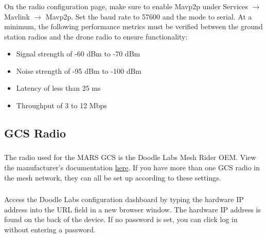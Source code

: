             \subsubsection{} On the radio configuration page, make sure to enable Mavp2p under Services $\rightarrow$ Mavlink $\rightarrow$ Mavp2p. Set the baud rate to 57600 and the mode to serial. At a minimum, the following performance metrics must be verified between the ground station radios and the drone radio to ensure functionality:
            \begin{itemize}
                \item Signal strength of  -60 dBm to -70 dBm
                \item Noise strength of -95 dBm to -100 dBm
                \item Latency of less than 25 ms
                \item Throughput of 3 to 12 Mbps
            \end{itemize} 
        
        \subsection{GCS Radio}
        
            \subsubsection{} The radio used for the MARS GCS is the Doodle Labs Mesh Rider OEM. View the manufacturer's documentation \textcolor{blue} {\href{https://techlibrary.doodlelabs.com/multiband-oem-mesh-rider-radio-915-mhz-and-2450-mhz-ism-bands-1}{here}}. If you have more than one GCS radio in the mesh network, they can all be set up according to these settings.
        
            \subsubsection{} Access the Doodle Labs configuration dashboard by typing the hardware IP address into the URL field in a new browser window. The hardware IP address is found on the back of the device. If no password is set, you can click log in without entering a password.
            
